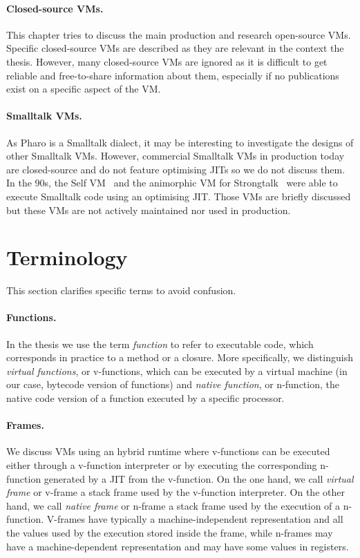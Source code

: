 \documentclass[a4paper,12pt,twoside]{../includes/ThesisStyle}
\begin{document}
\paragraph{Closed-source VMs.} This chapter tries to discuss the main production and research open-source VMs. Specific closed-source VMs are described as they are relevant in the context the thesis. However, many closed-source VMs are ignored as it is difficult to get reliable and free-to-share information about them, especially if no publications exist on a specific aspect of the VM. 

\paragraph{Smalltalk VMs.} As Pharo is a Smalltalk dialect, it may be interesting to investigate the designs of other Smalltalk VMs. However, commercial Smalltalk VMs in production today are closed-source and do not feature optimising JITs so we do not discuss them. In the 90s, the Self VM~\cite{UrsPHD} and the animorphic VM for Strongtalk~\cite{Sun06} were able to execute Smalltalk code using an optimising JIT. Those VMs are briefly discussed but these VMs are not actively maintained nor used in production.


\section{Terminology}

This section clarifies specific terms to avoid confusion.

\paragraph{Functions.} In the thesis we use the term \emph{function} to refer to executable code, which corresponds in practice to a method or a closure. More specifically, we distinguish \emph{virtual functions}, or v-functions, which can be executed by a virtual machine (in our case, bytecode version of functions) and \emph{native function}, or n-function, the native code version of a function executed by a specific processor. 

\paragraph{Frames.} We discuss VMs using an hybrid runtime where v-functions can be executed either through a v-function interpreter or by executing the corresponding n-function generated by a JIT from the v-function. On the one hand, we call \emph{virtual frame} or v-frame a stack frame used by the v-function interpreter. On the other hand, we call \emph{native frame} or n-frame a stack frame used by the execution of a n-function. V-frames have typically a machine-independent representation and all the values used by the execution stored inside the frame, while n-frames may have a machine-dependent representation and may have some values in registers.
\end{document}

